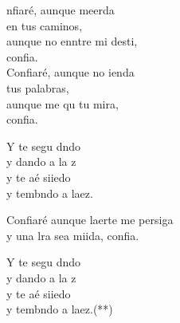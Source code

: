 \begin{cancion}[Confiaré][]%
	nfiaré, aunque meerda \\
en tus caminos,\\
	aunque no enntre mi desti, \\
	confia. \\
	Confiaré, aunque no ienda \\
tus palabras,\\
	aunque me qu tu mira, \\
	confia. \\
	\begin{chorus}%
	Y te segu dndo  \\
	y dando a la z\\
	y te aé siiedo \\
	y tembndo a laez.\\
	\end{chorus}%
	Confiaré aunque laerte me persiga\\
	y una lra sea miida, confia. \\
	\begin{chorus}%
	Y te segu dndo  \\
	y dando a la z\\
	y te aé siiedo \\
	y tembndo a laez.(**)\\
	\end{chorus}%
\end{cancion}%
